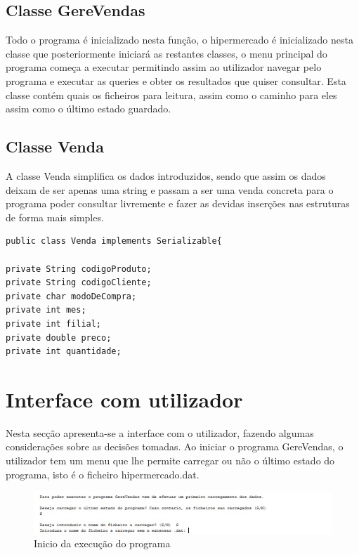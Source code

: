 \section{Classe GereVendas}

Todo o programa é inicializado nesta função, o hipermercado é inicializado nesta classe que posteriormente iniciará as restantes classes, o menu principal do programa começa  a executar permitindo assim ao utilizador navegar pelo programa e executar as queries e obter os resultados que quiser consultar.
Esta classe contém quais os ficheiros para leitura, assim como o caminho para eles assim como o último estado guardado. 

\section{Classe Venda}

A classe Venda simplifica os dados introduzidos, sendo que assim os dados deixam de ser apenas uma string e passam a ser uma venda concreta para o programa poder consultar livremente e fazer as devidas inserções nas estruturas de forma mais simples.


\begin{verbatim}
public class Venda implements Serializable{

private String codigoProduto;
private String codigoCliente;
private char modoDeCompra;
private int mes;
private int filial;
private double preco;
private int quantidade;
\end{verbatim}



\chapter{Interface com utilizador}

Nesta secção apresenta-se a interface com o utilizador, fazendo algumas considerações sobre as decisões tomadas.
Ao iniciar o programa GereVendas, o utilizador tem um menu que lhe permite carregar ou não o último estado do programa, isto é o ficheiro hipermercado.dat. 

\begin{figure}[h!]
	\includegraphics[scale=1]{IntroduzirUmFicheiroStream.jpg}  
	\caption{Inicio da execução do programa }  
\end{figure}

